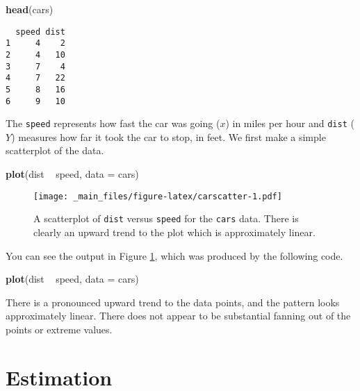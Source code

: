 \documentclass[]{book}
\newenvironment{Shaded}{\begin{snugshade}}{\end{snugshade}}
\newcommand{\KeywordTok}[1]{\textcolor[rgb]{0.13,0.29,0.53}{\textbf{{#1}}}}
\newcommand{\DataTypeTok}[1]{\textcolor[rgb]{0.13,0.29,0.53}{{#1}}}
\newcommand{\StringTok}[1]{\textcolor[rgb]{0.31,0.60,0.02}{{#1}}}
\newcommand{\NormalTok}[1]{{#1}}
\numberwithin{equation}{chapter}
\numberwithin{figure}{chapter}
\theoremstyle{plain}
\theoremstyle{definition}
\theoremstyle{remark}
\theoremstyle{definition}
\theoremstyle{definition}
\theoremstyle{remark}
\begin{document}
\begin{Shaded}
\begin{Highlighting}[]
\KeywordTok{head}\NormalTok{(cars)}
\end{Highlighting}
\end{Shaded}

\begin{verbatim}
  speed dist
1     4    2
2     4   10
3     7    4
4     7   22
5     8   16
6     9   10
\end{verbatim}

The \texttt{speed} represents how fast the car was going (\(x\)) in
miles per hour and \texttt{dist} (\(Y\)) measures how far it took the
car to stop, in feet. We first make a simple scatterplot of the data.

\begin{Shaded}
\begin{Highlighting}[]
\KeywordTok{plot}\NormalTok{(dist ~}\StringTok{ }\NormalTok{speed, }\DataTypeTok{data =} \NormalTok{cars)}
\end{Highlighting}
\end{Shaded}

\begin{figure}[htbp]
\centering
\texttt{[image: \_main\_files/figure-latex/carscatter-1.pdf]}
\caption{\label{fig:carscatter}\small A scatterplot of \texttt{dist} versus
\texttt{speed} for the \texttt{cars} data. There is clearly an upward
trend to the plot which is approximately linear.}
\end{figure}





You can see the output in Figure \ref{fig:carscatter}, which was
produced by the following code.

\begin{Shaded}
\begin{Highlighting}[]
\KeywordTok{plot}\NormalTok{(dist ~}\StringTok{ }\NormalTok{speed, }\DataTypeTok{data =} \NormalTok{cars)}
\end{Highlighting}
\end{Shaded}

There is a pronounced upward trend to the data points, and the pattern
looks approximately linear. There does not appear to be substantial
fanning out of the points or extreme values.

\section{Estimation}\label{sec-slr-estimation}
\end{document}

